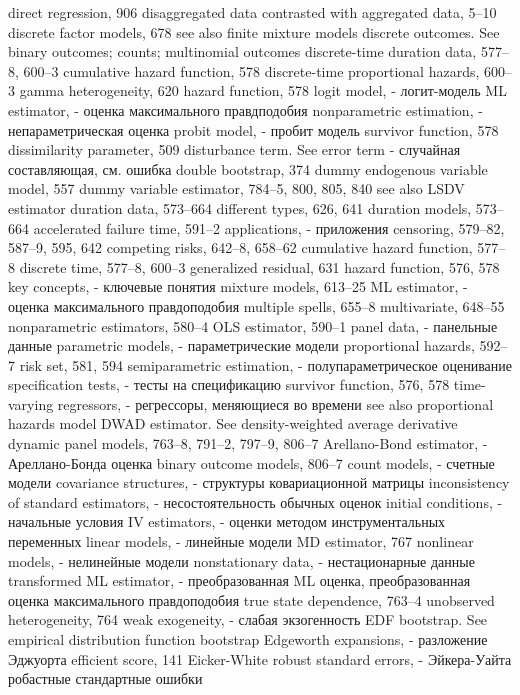 direct regression, 906 disaggregated data
contrasted with aggregated data, 5–10 discrete factor models, 678
see also finite mixture models
discrete outcomes. See binary outcomes; counts;
multinomial outcomes
discrete-time duration data, 577–8, 600–3
cumulative hazard function, 578 discrete-time proportional hazards, 600–3 gamma heterogeneity, 620
hazard function, 578
logit model, - логит-модель
ML estimator, - оценка максимального правдподобия
nonparametric estimation, - непараметрическая оценка
probit model, - пробит модель
survivor function, 578
dissimilarity parameter, 509
disturbance term. See error term - случайная составляющая, см. ошибка
double bootstrap, 374
dummy endogenous variable model, 557 dummy variable estimator, 784–5, 800, 805, 840
see also LSDV estimator duration data, 573–664
different types, 626, 641 duration models, 573–664
accelerated failure time, 591–2
applications, - приложения
censoring, 579–82, 587–9, 595, 642 competing risks, 642–8, 658–62
cumulative hazard function, 577–8 discrete time, 577–8, 600–3 generalized residual, 631
hazard function, 576, 578
key concepts, - ключевые понятия
mixture models, 613–25
ML estimator, - оценка максимального правдоподобия
multiple spells, 655–8 multivariate, 648–55 nonparametric estimators, 580–4 OLS estimator, 590–1
panel data, - панельные данные
parametric models, - параметрические модели
proportional hazards, 592–7
risk set, 581, 594
semiparametric estimation, - полупараметрическое оценивание 
specification tests, - тесты на спецификацию
survivor function, 576, 578
time-varying regressors, - регрессоры, меняющиеся во времени
see also proportional hazards model
DWAD estimator. See density-weighted average derivative
dynamic panel models, 763–8, 791–2, 797–9, 806–7
Arellano-Bond estimator, - Ареллано-Бонда оценка
binary outcome models, 806–7
count models, - счетные модели
covariance structures, - структуры ковариационной матрицы
inconsistency of standard estimators, - несостоятельность обычных оценок 
initial conditions, - начальные условия
IV estimators, - оценки методом инструментальных переменных
linear models, - линейные модели
MD estimator, 767
nonlinear models, - нелинейные модели 
nonstationary data, - нестационарные данные
transformed ML estimator, - преобразованная ML оценка, преобразованная оценка максимального правдоподобия
true state dependence, 763–4 
unobserved heterogeneity, 764 
weak exogeneity, - слабая экзогенность
EDF bootstrap. See empirical distribution function bootstrap
Edgeworth expansions, - разложение Эджуорта
efficient score, 141
Eicker-White robust standard errors, - Эйкера-Уайта робастные стандартные ошибки 
